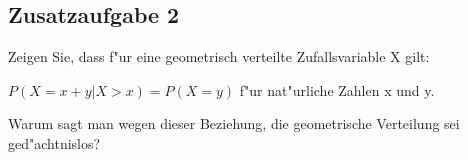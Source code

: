 \subsection*{Zusatzaufgabe 2}

Zeigen Sie, dass f"ur eine geometrisch verteilte Zufallsvariable X gilt:

$P(X = x+y|X>x) = P(X = y)$ \hspace{2cm}  f"ur nat"urliche Zahlen x und y.

\noindent Warum sagt man wegen dieser Beziehung, die geometrische Verteilung sei \glqq ged"achtnislos\grqq?